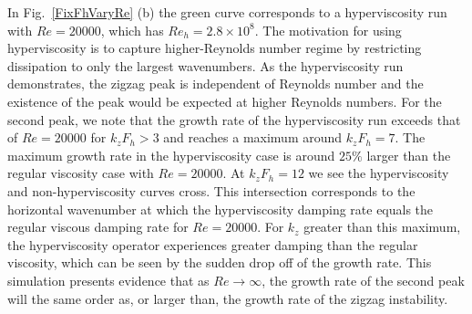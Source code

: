 


In Fig.~\ref{FixFhVaryRe} (b) the green curve corresponds to a hyperviscosity run with $Re=20000$, which has $Re_{h}=2.8\times 10^{8}$. The motivation for using hyperviscosity is to capture higher-Reynolds number regime by restricting dissipation to only the largest wavenumbers. As the hyperviscosity run demonstrates, the zigzag peak is independent of Reynolds number and the existence of the peak would be expected at higher Reynolds numbers. For the second peak, we note that the growth rate  of the hyperviscosity run exceeds that of $Re=20000$ for $k_{z}F_{h}>3$ and reaches a maximum around $k_{z}F_{h}=7$. The maximum growth rate in the hyperviscosity case is around $25\%$ larger than the regular viscosity case with $Re=20000$. At $k_{z}F_{h}=12$ we see the hyperviscosity and non-hyperviscosity curves cross. This intersection corresponds to the horizontal wavenumber at which the hyperviscosity damping rate equals the regular viscous damping rate for $Re=20000$. For $k_{z}$ greater than this maximum, the hyperviscosity operator experiences greater damping than the regular viscosity, which can be seen by the sudden drop off of the growth rate. This simulation presents evidence that as $Re\rightarrow \infty$, the growth rate of the second peak will the same order as, or larger than, the growth rate of the zigzag instability. 

